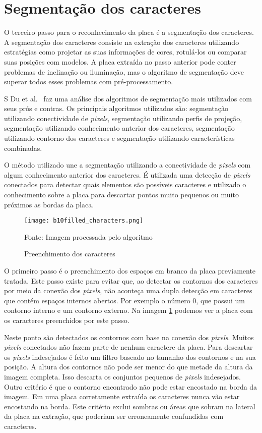 \section{Segmentação dos caracteres}
\label{sec:segmentacao}

O terceiro passo para o reconhecimento da placa é a segmentação dos caracteres.
A segmentação dos caracteres consiste na extração dos caracteres utilizando
estratégias como projetar as suas informações de cores, rotulá-los ou comparar
suas posições com modelos. A placa extraída no passo anterior pode conter
problemas de inclinação ou iluminação, mas o algoritmo de segmentação deve
superar todos esses problemas com pré-processamento.~\cite{s2013automatic}

S Du et al.~\cite{s2013automatic} faz uma análise dos algoritmos de segmentação mais
utilizados com seus prós e contras.  Os principais algoritmos utilizados são:
segmentação utilizando conectividade de \emph{pixels}, segmentação utilizando
perfis de projeção, segmentação utilizando conhecimento anterior dos caracteres,
segmentação utilizando contorno dos caracteres e segmentação utilizando
características combinadas.

O método utilizado une a segmentação utilizando a conectividade de \emph{pixels} com algum conhecimento anterior dos caracteres. É utilizada uma detecção de \emph{pixels} conectados para detectar quais elementos são possíveis caracteres e utilizado o conhecimento sobre a placa para descartar pontos muito pequenos ou muito próximos as bordas da placa.

\begin{figure}[H]
	\centering
	\texttt{[image: b10filled\_characters.png]}
	\caption{Preenchimento dos caracteres}
Fonte: Imagem processada pelo algoritmo
	\label{fig:preenchimento}
\end{figure}

O primeiro passo é o preenchimento dos espaços em branco da placa previamente tratada. Este passo existe para evitar que, ao detectar os contornos dos caracteres por meio da conexão dos \emph{pixels}, não aconteça uma dupla detecção em caracteres que contém espaços internos abertos. Por exemplo o número 0, que possui um contorno interno e um contorno externo. Na imagem \ref{fig:preenchimento} podemos ver a placa com os caracteres preenchidos por este passo.

Neste ponto são detectados os contornos com base na conexão dos \emph{pixels}. Muitos \emph{pixels} conectados não fazem parte de nenhum caractere da placa. Para descartar os \emph{pixels} indesejados é feito um filtro baseado no tamanho dos contornos e na sua posição. A altura dos contornos não pode ser menor do que metade da altura da imagem completa. Isso descarta os conjuntos pequenos de \emph{pixels} indesejados. Outro critério é que o contorno encontrado não pode estar encostado na borda da imagem. Em uma placa corretamente extraída os caracteres nunca vão estar encostando na borda. Este critério exclui sombras ou áreas que sobram na lateral da placa na extração, que poderiam ser erroneamente confundidas com caracteres.

